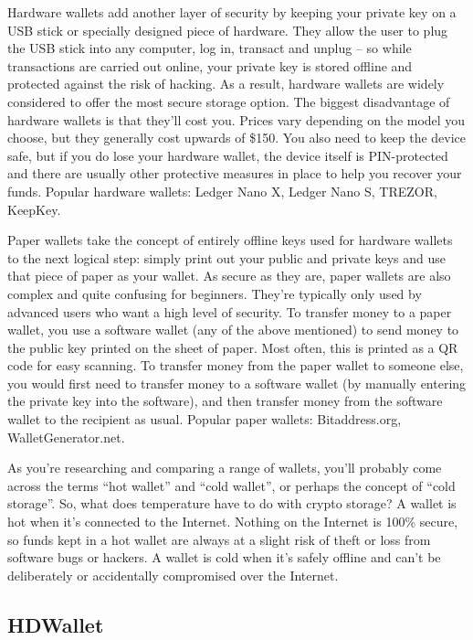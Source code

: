 Hardware wallets add another layer of security by keeping your private key on a USB stick or specially designed piece of hardware. They allow the user to plug the USB stick into any computer, log in, transact and unplug – so while transactions are carried out online, your private key is stored offline and protected against the risk of hacking. As a result, hardware wallets are widely considered to offer the most secure storage option. The biggest disadvantage of hardware wallets is that they’ll cost you. Prices vary depending on the model you choose, but they generally cost upwards of \$150. You also need to keep the device safe, but if you do lose your hardware wallet, the device itself is PIN-protected and there are usually other protective measures in place to help you recover your funds. Popular hardware wallets: Ledger Nano X, Ledger Nano S, TREZOR, KeepKey.

Paper wallets take the concept of entirely offline keys used for hardware wallets to the next logical step: simply print out your public and private keys and use that piece of paper as your wallet. As secure as they are, paper wallets are also complex and quite confusing for beginners. They’re typically only used by advanced users who want a high level of security. To transfer money to a paper wallet, you use a software wallet (any of the above mentioned) to send money to the public key printed on the sheet of paper. Most often, this is printed as a QR code for easy scanning. To transfer money from the paper wallet to someone else, you would first need to transfer money to a software wallet (by manually entering the private key into the software), and then transfer money from the software wallet to the recipient as usual. Popular paper wallets: Bitaddress.org, WalletGenerator.net.

As you’re researching and comparing a range of wallets, you’ll probably come across the terms “hot wallet” and “cold wallet”, or perhaps the concept of “cold storage”. So, what does temperature have to do with crypto storage?
A wallet is hot when it's connected to the Internet. Nothing on the Internet is 100\% secure, so funds kept in a hot wallet are always at a slight risk of theft or loss from software bugs or hackers. A wallet is cold when it's safely offline and can't be deliberately or accidentally compromised over the Internet.

\subsection{HDWallet}


